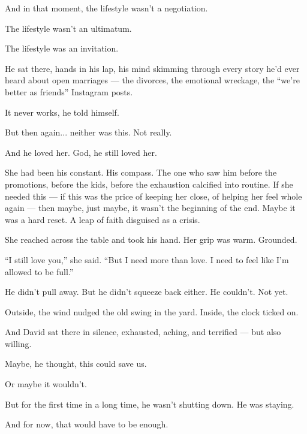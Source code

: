 And in that moment, the lifestyle wasn’t a negotiation.

The lifestyle wasn’t an ultimatum.

The lifestyle was an invitation.

He sat there, hands in his lap, his mind skimming through every story he’d ever heard about open marriages — the divorces, the emotional wreckage, the “we’re better as friends” Instagram posts.

It never works, he told himself.

But then again... neither was this. Not really.

And he loved her. God, he still loved her.

She had been his constant. His compass. The one who saw him before the promotions, before the kids, before the exhaustion calcified into routine. If she needed this — if this was the price of keeping her close, of helping her feel whole again — then maybe, just maybe, it wasn’t the beginning of the end. Maybe it was a hard reset. A leap of faith disguised as a crisis.

She reached across the table and took his hand. Her grip was warm. Grounded.

“I still love you,” she said. “But I need more than love. I need to feel like I’m allowed to be full.”

He didn’t pull away. But he didn’t squeeze back either. He couldn’t. Not yet.

Outside, the wind nudged the old swing in the yard. Inside, the clock ticked on.

And David sat there in silence, exhausted, aching, and terrified — but also willing.

Maybe, he thought, this could save us.

Or maybe it wouldn’t.

But for the first time in a long time, he wasn’t shutting down. He was staying.

And for now, that would have to be enough.

\medskip

